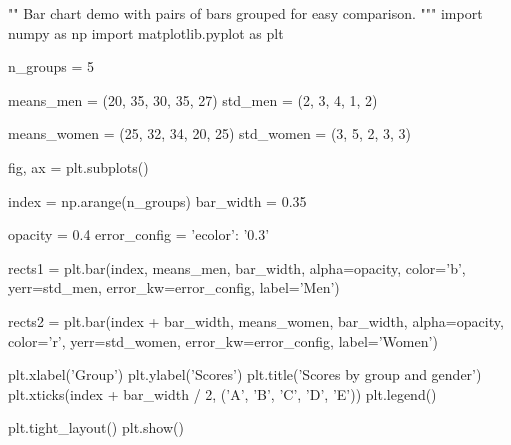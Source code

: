 ""
Bar chart demo with pairs of bars grouped for easy comparison.
"""
import numpy as np
import matplotlib.pyplot as plt


n_groups = 5

means_men = (20, 35, 30, 35, 27)
std_men = (2, 3, 4, 1, 2)

means_women = (25, 32, 34, 20, 25)
std_women = (3, 5, 2, 3, 3)

fig, ax = plt.subplots()

index = np.arange(n_groups)
bar_width = 0.35

opacity = 0.4
error_config = {'ecolor': '0.3'}

rects1 = plt.bar(index, means_men, bar_width,
                 alpha=opacity,
                 color='b',
                 yerr=std_men,
                 error_kw=error_config,
                 label='Men')

rects2 = plt.bar(index + bar_width, means_women, bar_width,
                 alpha=opacity,
                 color='r',
                 yerr=std_women,
                 error_kw=error_config,
                 label='Women')

plt.xlabel('Group')
plt.ylabel('Scores')
plt.title('Scores by group and gender')
plt.xticks(index + bar_width / 2, ('A', 'B', 'C', 'D', 'E'))
plt.legend()

plt.tight_layout()
plt.show()

